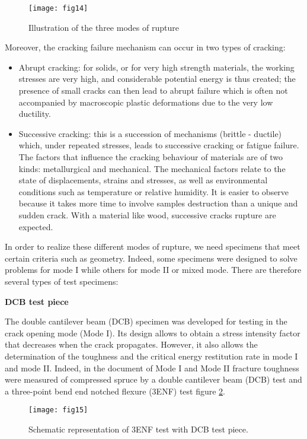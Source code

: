 \begin{figure}[htp]
	\centering
	\texttt{[image: fig14]}
	\caption{Illustration of the three modes of rupture}
	\label{fig:fig14}
\end{figure}

Moreover, the cracking failure mechanism can occur in two types of cracking: 

\begin{itemize}
	\item Abrupt cracking: for solids, or for very high strength materials, the working stresses are very high, and considerable potential energy is thus created; the presence of small cracks can then lead to abrupt failure which is often not accompanied by macroscopic plastic deformations due to the very low ductility. 
	\item Successive cracking: this is a succession of mechanisms (brittle - ductile) which, under repeated stresses, leads to successive cracking or fatigue failure. The factors that influence the cracking behaviour of materials are of two kinds: metallurgical and mechanical. The mechanical factors relate to the state of displacements, strains and stresses, as well as environmental conditions such as temperature or relative humidity. It is easier to observe because it takes more time to involve samples destruction than a unique and sudden crack. With a material like wood, successive cracks rupture are expected.
\end{itemize}

In order to realize these different modes of rupture, we need specimens that meet certain criteria such as geometry. Indeed, some specimens were designed to solve problems for mode I while others for mode II or mixed mode. There are therefore several types of test specimens:

\textbf{DCB test piece}

The double cantilever beam (DCB) specimen was developed for testing in the crack opening mode (Mode I). Its design allows to obtain a stress intensity factor that decreases when the crack propagates. However, it also allows the determination of the toughness and the critical energy restitution rate in mode I and mode II. Indeed, in the document of \cite{YoshiharaandNobusue2008} Mode I and Mode II fracture toughness were measured of compressed spruce by a double cantilever beam (DCB) test and a three-point bend end notched flexure (3ENF) test figure \ref{fig:fig15}.


\begin{figure}[htp]
	\centering
	\texttt{[image: fig15]}
	\caption{Schematic representation of 3ENF test with DCB test piece. \cite{DavidsonandSun2005}}
	\label{fig:fig15}
\end{figure}

